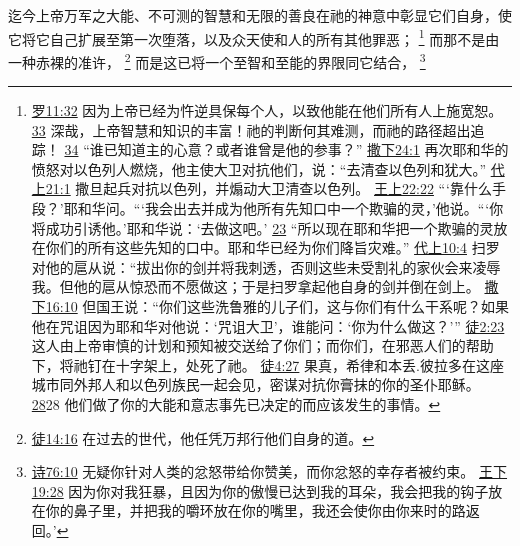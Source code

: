 \documentclass[12pt, a4paper, oneside]{ctexart}
\newcounter{parnum}[section]
\newcommand{\N}{%
   \noindent\refstepcounter{parnum}%
    \makebox[\parindent][l]{\textbf{\arabic{parnum}.}}}
\begin{document}
\N 迄今上帝万军之大能、不可测的智慧和无限的善良在祂的神意中彰显它们自身，使它将它自己扩展至第一次堕落，以及众天使和人的所有其他罪恶；
	\footnote {
		\href{https://biblehub.com/romans/11-32.htm}{罗11:32} 因为上帝已经为忤逆具保每个人，以致他能在他们所有人上施宽恕。
		\href{https://biblehub.com/romans/11-33.htm}{33} 深哉，上帝智慧和知识的丰富！祂的判断何其难测，而祂的路径超出追踪！
		\href{https://biblehub.com/romans/11-34.htm}{34} “谁已知道主的心意？或者谁曾是他的参事？”
		\href{https://biblehub.com/2_samuel/24-1.htm}{撒下24:1} 再次耶和华的愤怒对以色列人燃烧，他主使大卫对抗他们，说：“去清查以色列和犹大。”
		\href{https://biblehub.com/1_chronicles/21-1.htm}{代上21:1} 撒旦起兵对抗以色列，并煽动大卫清查以色列。
		\href{https://biblehub.com/1_kings/22-22.htm}{王上22:22} “‘靠什么手段？’耶和华问。“‘我会出去并成为他所有先知口中一个欺骗的灵，’他说。“‘你将成功引诱他。’耶和华说：‘去做这吧。’
		\href{https://biblehub.com/1_kings/22-23.htm}{23} “所以现在耶和华把一个欺骗的灵放在你们的所有这些先知的口中。耶和华已经为你们降旨灾难。”
		\href{https://biblehub.com/1_chronicles/10-4.htm}{代上10:4} 扫罗对他的扈从说：“拔出你的剑并将我刺透，否则这些未受割礼的家伙会来凌辱我。但他的扈从惊恐而不愿做这；于是扫罗拿起他自身的剑并倒在剑上。
		\href{https://biblehub.com/2_samuel/16-10.htm}{撒下16:10} 但国王说：“你们这些洗鲁雅的儿子们，这与你们有什么干系呢？如果他在咒诅因为耶和华对他说：‘咒诅大卫’，谁能问：‘你为什么做这？’”
		\href{https://biblehub.com/acts/2-23.htm}{徒2:23} 这人由上帝审慎的计划和预知被交送给了你们；而你们，在邪恶人们的帮助下，将祂钉在十字架上，处死了祂。
		\href{https://biblehub.com/acts/4-27.htm}{徒4:27} 果真，希律和本丢.彼拉多在这座城市同外邦人和以色列族民一起会见，密谋对抗你膏抹的你的圣仆耶稣。
		\href{https://biblehub.com/acts/4-28.htm}{28}28 他们做了你的大能和意志事先已决定的而应该发生的事情。
	}
	而那不是由一种赤裸的准许，
	\footnote {
		\href{https://biblehub.com/acts/14-16.htm}{徒14:16} 在过去的世代，他任凭万邦行他们自身的道。
	}
	而是这已将一个至智和至能的界限同它结合，
	\footnote {
		\href{https://biblehub.com/psalms/76-10.htm}{诗76:10} 无疑你针对人类的忿怒带给你赞美，而你忿怒的幸存者被约束。
		\href{https://biblehub.com/2_kings/19-28.htm}{王下19:28} 因为你对我狂暴，且因为你的傲慢已达到我的耳朵，我会把我的钩子放在你的鼻子里，并把我的嚼环放在你的嘴里，我还会使你由你来时的路返回。’
	}
\end{document}
